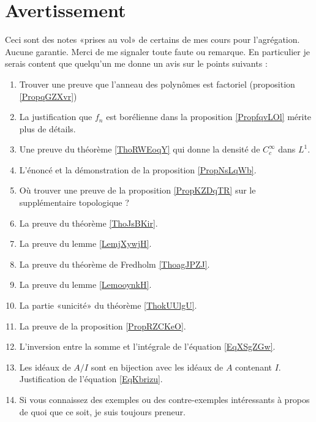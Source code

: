 
\section{Avertissement}

Ceci sont des notes «prises au vol» de certains de mes cours pour l'agrégation. Aucune garantie. Merci de me signaler toute faute ou remarque. En particulier je serais content que quelqu'un me donne un avis sur le points suivants :
\begin{enumerate}
    \item
        Trouver une preuve que l'anneau des polynômes est factoriel (proposition \ref{PropqGZXvr})
    \item
        La justification que \( f_n\) est borélienne dans la proposition \ref{PropfqvLOl} mérite plus de détails.
    \item
        Une preuve du théorème \ref{ThoRWEoqY} qui donne la densité de \( C^{\infty}_c\) dans \( L^1\).
    \item
        L'énoncé et la démonstration de la proposition \ref{PropNsLqWb}.
    \item
        Où trouver une preuve de la proposition \ref{PropKZDqTR} sur le supplémentaire topologique ?
    \item
        La preuve du théorème \ref{ThoJsBKir}.
    \item
        La preuve du lemme \ref{LemjXywjH}.
    \item
        La preuve du théorème de Fredholm \ref{ThoagJPZJ}.
    \item
        La preuve du lemme \ref{LemooynkH}.
    \item
        La partie «unicité» du théorème \ref{ThokUUlgU}.
    \item
        La preuve de la proposition \ref{PropRZCKeO}.
    \item
        L'inversion entre la somme et l'intégrale de l'équation \eqref{EqXSgZGw}.
    \item
        Les idéaux de \( A/I\) sont en bijection avec les idéaux de \( A\) contenant \( I\). Justification de l'équation \eqref{EqKbrizu}.
    \item
        Si vous connaissez des exemples ou des contre-exemples intéressants à propos de quoi que ce soit, je suis toujours preneur.
\end{enumerate}


